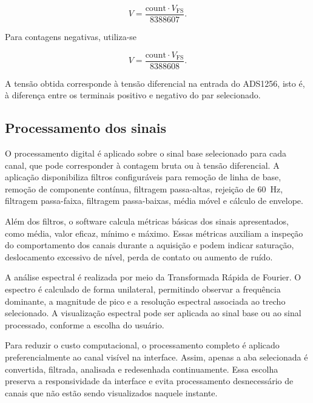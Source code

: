 \documentclass[a4paper,12pt]{fcte}
\begin{document}
\begin{equation}
    V =
    \frac{\mathrm{count}\cdot V_{\mathrm{FS}}}{8388607}.
    \label{eq:conversao_ads_positiva}
\end{equation}

\noindent
Para contagens negativas, utiliza-se

\begin{equation}
    V =
    \frac{\mathrm{count}\cdot V_{\mathrm{FS}}}{8388608}.
    \label{eq:conversao_ads_negativa}
\end{equation}

\noindent
A tensão obtida corresponde à tensão diferencial na entrada do ADS1256, isto é, à diferença entre os terminais positivo e negativo do par selecionado.

\subsection{Processamento dos sinais}
\label{subsec:processamento_sinais_software}

O processamento digital é aplicado sobre o sinal base selecionado para cada canal, que pode corresponder à contagem bruta ou à tensão diferencial. A aplicação disponibiliza filtros configuráveis para remoção de linha de base, remoção de componente contínua, filtragem passa-altas, rejeição de 60~Hz, filtragem passa-faixa, filtragem passa-baixas, média móvel e cálculo de envelope.

Além dos filtros, o software calcula métricas básicas dos sinais apresentados, como média, valor eficaz, mínimo e máximo. Essas métricas auxiliam a inspeção do comportamento dos canais durante a aquisição e podem indicar saturação, deslocamento excessivo de nível, perda de contato ou aumento de ruído.

A análise espectral é realizada por meio da Transformada Rápida de Fourier. O espectro é calculado de forma unilateral, permitindo observar a frequência dominante, a magnitude de pico e a resolução espectral associada ao trecho selecionado. A visualização espectral pode ser aplicada ao sinal base ou ao sinal processado, conforme a escolha do usuário.

Para reduzir o custo computacional, o processamento completo é aplicado preferencialmente ao canal visível na interface. Assim, apenas a aba selecionada é convertida, filtrada, analisada e redesenhada continuamente. Essa escolha preserva a responsividade da interface e evita processamento desnecessário de canais que não estão sendo visualizados naquele instante.
\end{document}
